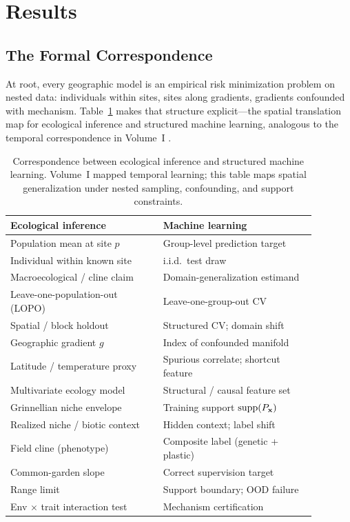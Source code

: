 \documentclass[11pt]{article}
\begin{document}
\section{Results}
\label{sec:results}

\subsection{The Formal Correspondence}
\label{sec:correspondence}

At root, every geographic model is an empirical risk minimization problem on
nested data: individuals within sites, sites along gradients, gradients
confounded with mechanism.  Table~\ref{tab:correspondence} makes that
structure explicit---the spatial translation map for ecological inference
and structured machine learning, analogous to the temporal correspondence in
Volume~I \citep{stillwell2026a}.

\begin{table}[t]
  \caption{Correspondence between ecological inference and structured machine
    learning.  Volume~I mapped temporal learning; this table maps spatial
    generalization under nested sampling, confounding, and support constraints.}
  \label{tab:correspondence}
  \begin{center}
  \small
  \begin{tabular}{p{0.44\linewidth}p{0.44\linewidth}}
    \toprule
    Ecological inference & Machine learning \\
    \midrule
    Population mean at site $p$ & Group-level prediction target \\
    Individual within known site & i.i.d.\ test draw \\
    Macroecological / cline claim & Domain-generalization estimand \\
    Leave-one-population-out (LOPO) & Leave-one-group-out CV \\
    Spatial / block holdout & Structured CV; domain shift \\
    Geographic gradient $g$ & Index of confounded manifold \\
    Latitude / temperature proxy & Spurious correlate; shortcut feature \\
    Multivariate ecology model & Structural / causal feature set \\
    Grinnellian niche envelope & Training support $\mathrm{supp}(P_{\mathbf{x}})$ \\
    Realized niche / biotic context & Hidden context; label shift \\
    Field cline (phenotype) & Composite label (genetic + plastic) \\
    Common-garden slope & Correct supervision target \\
    Range limit & Support boundary; OOD failure \\
    Env $\times$ trait interaction test & Mechanism certification \\
    \bottomrule
  \end{tabular}
  \end{center}
\end{table}
\end{document}
